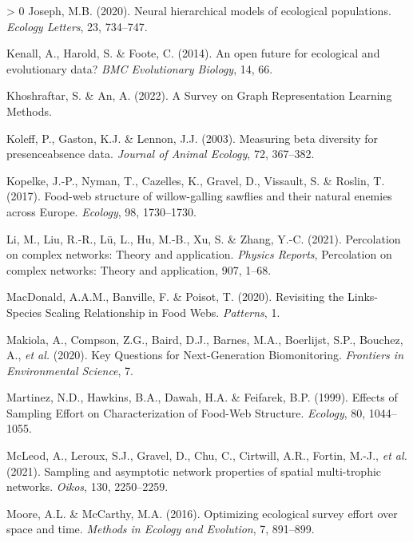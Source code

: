 \documentclass[11pt]{article}
\newlength{\cslhangindent}
\newenvironment{CSLReferences}[3] %
 {%
  \setlength{\parindent}{0pt}
  \ifodd #1 \everypar{\setlength{\hangindent}{\cslhangindent}}\ignorespaces\fi
  \ifnum #2 > 0
  \setlength{\parskip}{#2\baselineskip}
  \fi
 }%
 {}
\begin{document}
\begin{CSLReferences}{1}{0}
\leavevmode\hypertarget{ref-Joseph2020NeuHie}{}%
Joseph, M.B. (2020). Neural hierarchical models of ecological
populations. \emph{Ecology Letters}, 23, 734--747.

\leavevmode\hypertarget{ref-Kenall2014OpeFut}{}%
Kenall, A., Harold, S. \& Foote, C. (2014). An open future for
ecological and evolutionary data? \emph{BMC Evolutionary Biology}, 14,
66.

\leavevmode\hypertarget{ref-Khoshraftar2022SurGra}{}%
Khoshraftar, S. \& An, A. (2022). A Survey on Graph Representation
Learning Methods.

\leavevmode\hypertarget{ref-Koleff2003MeaBet}{}%
Koleff, P., Gaston, K.J. \& Lennon, J.J. (2003). Measuring beta
diversity for presenceabsence data. \emph{Journal of Animal Ecology},
72, 367--382.

\leavevmode\hypertarget{ref-Kopelke2017FooStr}{}%
Kopelke, J.-P., Nyman, T., Cazelles, K., Gravel, D., Vissault, S. \&
Roslin, T. (2017). Food-web structure of willow-galling sawflies and
their natural enemies across Europe. \emph{Ecology}, 98, 1730--1730.

\leavevmode\hypertarget{ref-Li2021PerCom}{}%
Li, M., Liu, R.-R., Lü, L., Hu, M.-B., Xu, S. \& Zhang, Y.-C. (2021).
Percolation on complex networks: Theory and application. \emph{Physics
Reports}, Percolation on complex networks: Theory and application, 907,
1--68.

\leavevmode\hypertarget{ref-MacDonald2020RevLin}{}%
MacDonald, A.A.M., Banville, F. \& Poisot, T. (2020). Revisiting the
Links-Species Scaling Relationship in Food Webs. \emph{Patterns}, 1.

\leavevmode\hypertarget{ref-Makiola2020KeyQue}{}%
Makiola, A., Compson, Z.G., Baird, D.J., Barnes, M.A., Boerlijst, S.P.,
Bouchez, A., \emph{et al.} (2020). Key Questions for Next-Generation
Biomonitoring. \emph{Frontiers in Environmental Science}, 7.

\leavevmode\hypertarget{ref-Martinez1999EffSam}{}%
Martinez, N.D., Hawkins, B.A., Dawah, H.A. \& Feifarek, B.P. (1999).
Effects of Sampling Effort on Characterization of Food-Web Structure.
\emph{Ecology}, 80, 1044--1055.

\leavevmode\hypertarget{ref-McLeod2021SamAsy}{}%
McLeod, A., Leroux, S.J., Gravel, D., Chu, C., Cirtwill, A.R., Fortin,
M.-J., \emph{et al.} (2021). Sampling and asymptotic network properties
of spatial multi-trophic networks. \emph{Oikos}, 130, 2250--2259.

\leavevmode\hypertarget{ref-Moore2016OptEco}{}%
Moore, A.L. \& McCarthy, M.A. (2016). Optimizing ecological survey
effort over space and time. \emph{Methods in Ecology and Evolution}, 7,
891--899.


\end{CSLReferences}
\end{document}
